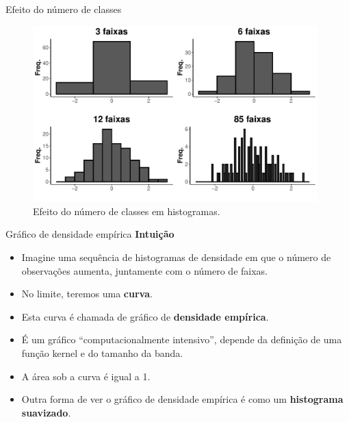 \documentclass[
  ignorenonframetext,
  serif,
  professionalfont,
  usenames,
  dvipsnames,
  aspectratio = 169]{beamer}
\begin{document}
\begin{frame}{Efeito do número de classes}
\label{efeito-do-nuxfamero-de-classes-1}
\begin{figure}

{\centering \includegraphics[width=11cm]{encontro1_files/figure-beamer/unnamed-chunk-51-1} 

}

\caption{Efeito do número de classes em histogramas.}\label{fig:unnamed-chunk-51}
\end{figure}
\end{frame}

\begin{frame}{Gráfico de densidade empírica}
\label{gruxe1fico-de-densidade-empuxedrica}
\textbf{Intuição}

\begin{itemize}
\item
  Imagine uma sequência de histogramas de densidade em que o número de
  observações aumenta, juntamente com o número de faixas.
\item
  No limite, teremos uma \textbf{curva}.
\item
  Esta curva é chamada de gráfico de \textbf{densidade empírica}.
\item
  É um gráfico ``computacionalmente intensivo'', depende da definição de
  uma função kernel e do tamanho da banda.
\item
  A área sob a curva é igual a 1.
\item
  Outra forma de ver o gráfico de densidade empírica é como um
  \textbf{histograma suavizado}.
\end{itemize}
\end{frame}
\end{document}
